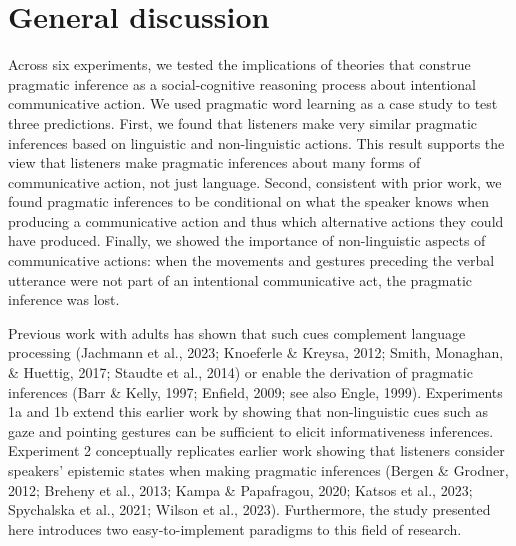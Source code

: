\documentclass[
  man,floatsintext]{apa6}
\begin{document}
\section{General discussion}\label{general-discussion}

Across six experiments, we tested the implications of theories that construe pragmatic inference as a social-cognitive reasoning process about intentional communicative action. We used pragmatic word learning as a case study to test three predictions. First, we found that listeners make very similar pragmatic inferences based on linguistic and non-linguistic actions. This result supports the view that listeners make pragmatic inferences about many forms of communicative action, not just language. Second, consistent with prior work, we found pragmatic inferences to be conditional on what the speaker knows when producing a communicative action and thus which alternative actions they could have produced. Finally, we showed the importance of non-linguistic aspects of communicative actions: when the movements and gestures preceding the verbal utterance were not part of an intentional communicative act, the pragmatic inference was lost.

Previous work with adults has shown that such cues complement language processing (Jachmann et al., 2023; Knoeferle \& Kreysa, 2012; Smith, Monaghan, \& Huettig, 2017; Staudte et al., 2014) or enable the derivation of pragmatic inferences (Barr \& Kelly, 1997; Enfield, 2009; see also Engle, 1999). Experiments 1a and 1b extend this earlier work by showing that non-linguistic cues such as gaze and pointing gestures can be sufficient to elicit informativeness inferences. Experiment 2 conceptually replicates earlier work showing that listeners consider speakers' epistemic states when making pragmatic inferences (Bergen \& Grodner, 2012; Breheny et al., 2013; Kampa \& Papafragou, 2020; Katsos et al., 2023; Spychalska et al., 2021; Wilson et al., 2023). Furthermore, the study presented here introduces two easy-to-implement paradigms to this field of research.
\end{document}
